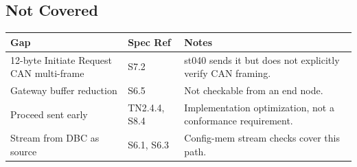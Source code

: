 \subsection{Not Covered}

\begin{tabular}{|p{4cm}|p{2.5cm}|p{6cm}|}
\hline
\textbf{Gap} & \textbf{Spec Ref} & \textbf{Notes} \\
\hline
12-byte Initiate Request CAN multi-frame & S7.2 & st040 sends it but does not explicitly verify CAN framing. \\
\hline
Gateway buffer reduction & S6.5 & Not checkable from an end node. \\
\hline
Proceed sent early & TN2.4.4, S8.4 & Implementation optimization, not a conformance requirement. \\
\hline
Stream from DBC as source & S6.1, S6.3 & Config-mem stream checks cover this path. \\
\hline
\end{tabular}


